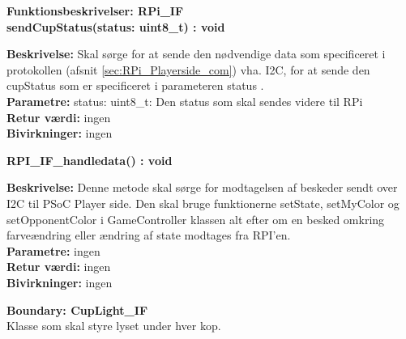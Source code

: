 \documentclass[Arkitektur/System_main.tex]{subfiles}
\begin{document}
{\large\textbf{Funktionsbeskrivelser: RPi\_IF}}\\[0.2cm]
\textbf{sendCupStatus(status: uint8\_t) : void}
\begin{adjustwidth}{1cm}{0pt}
\textbf{Beskrivelse:} Skal sørge for at sende den nødvendige data som specificeret i protokollen (afsnit \ref{sec:RPi_Playerside_com}) vha. I2C, for at sende den cupStatus som er specificeret i parameteren status .\\[0.2cm]
\textbf{Parametre:} status: uint8\_t: Den status som skal sendes videre til RPi \\[0.2cm]
\textbf{Retur værdi:} ingen \\[0.2cm]
\textbf{Bivirkninger:} ingen \\[0.2cm]
\end{adjustwidth}

\textbf{RPI\_IF\_handledata() : void}
\begin{adjustwidth}{1cm}{0pt}
\textbf{Beskrivelse:}
Denne metode skal sørge for modtagelsen af beskeder sendt over I2C til PSoC Player side. Den skal bruge funktionerne setState, setMyColor og setOpponentColor i GameController klassen alt efter om en besked omkring farveændring eller ændring af state  modtages fra RPI'en.
\\[0.2cm]
\textbf{Parametre:} ingen \\[0.2cm]
\textbf{Retur værdi:} ingen \\[0.2cm]
\textbf{Bivirkninger:} ingen \\[0.2cm]
\end{adjustwidth}

{\large\textbf{Boundary:  CupLight\_IF}}\\
Klasse som skal styre lyset under hver kop.
\end{document}
